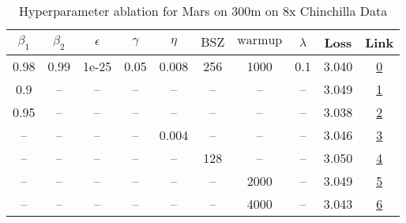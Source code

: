 \begin{table}[H]
\centering
\caption{Hyperparameter ablation for Mars on 300m on 8x Chinchilla Data}
\label{tab:ablation_mars_300m_8}
\begin{tabular}{cccccccccc}
\toprule
$\beta_1$ & $\beta_2$ & $\epsilon$ & $\gamma$ & $\eta$ & $\mathrm{BSZ}$ & $\mathrm{warmup}$ & $\lambda$ & Loss & Link \\
\midrule
0.98 & 0.99 & 1e-25 & 0.05 & 0.008 & 256 & 1000 & 0.1 & 3.040 & \href{https://wandb.ai/stanford-mercury/optimizer-scaling/runs/sweep-300m-48B-mars3a0394lr0.008-wd0.1-minlr0-warmup1000-b10.98--b18370}{0} \\
\midrule
0.9 & -- & -- & -- & -- & -- & -- & -- & 3.049 & \href{https://wandb.ai/stanford-mercury/optimizer-scaling/runs/sweep-300m-48B-mars4c3c64lr0.008-wd0.1-minlr0-warmup1000-b10.9-b-ccb8c7}{1} \\
0.95 & -- & -- & -- & -- & -- & -- & -- & 3.038 & \href{https://wandb.ai/stanford-mercury/optimizer-scaling/runs/sweep-300m-48B-mars1b232dlr0.008-wd0.1-minlr0-warmup1000-b10.95--2bd6f5}{2} \\
-- & -- & -- & -- & 0.004 & -- & -- & -- & 3.046 & \href{https://wandb.ai/stanford-mercury/optimizer-scaling/runs/sweep-300m-48B-mars0f0b4flr0.004-wd0.1-minlr0-warmup1000-b10.98--98eb68}{3} \\
-- & -- & -- & -- & -- & 128 & -- & -- & 3.050 & \href{https://wandb.ai/stanford-mercury/optimizer-scaling/runs/sweep-300m-48B-marsac45felr0.008-wd0.1-minlr0-warmup1000-b10.98--af6362}{4} \\
-- & -- & -- & -- & -- & -- & 2000 & -- & 3.049 & \href{https://wandb.ai/stanford-mercury/optimizer-scaling/runs/sweep-300m-48B-marsfe179elr0.008-wd0.1-minlr0-warmup2000-b10.98--8b1315}{5} \\
-- & -- & -- & -- & -- & -- & 4000 & -- & 3.043 & \href{https://wandb.ai/stanford-mercury/optimizer-scaling/runs/sweep-300m-48B-mars529c1blr0.008-wd0.1-minlr0-warmup4000-b10.98--47eaf7}{6} \\
\bottomrule
\end{tabular}
\end{table}

